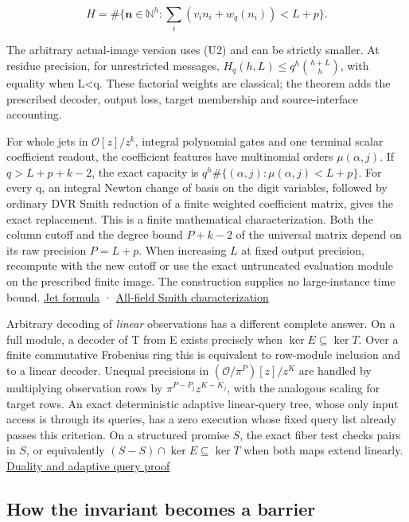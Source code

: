 \documentclass[
  11pt,
]{article}
\begin{document}
\[
 H=\#\{\boldsymbol n\in\mathbb N^h:
       \sum_i(v_i n_i+w_q(n_i))<L+p\}. \tag{U6}
\]

The arbitrary actual-image version uses (U2) and can be strictly
smaller. At residue precision, for unrestricted messages,
\(H_q(h,L)\le q^h\binom{h+L}{h}\), with equality when L\textless q.
These factorial weights are classical; the theorem adds the prescribed
decoder, output loss, target membership and source-interface accounting.

For whole jets in \(\mathcal O[z]/z^k\), integral polynomial gates and
one terminal scalar coefficient readout, the coefficient features have
multinomial orders \(\mu(\alpha,j)\). If \(q>L+p+k-2\), the exact
capacity is \(q^h\#\{(\alpha,j):\mu(\alpha,j)<L+p\}\). For every q, an
integral Newton change of basis on the digit variables, followed by
ordinary DVR Smith reduction of a finite weighted coefficient matrix,
gives the exact replacement. This is a finite mathematical
characterization. Both the column cutoff and the degree bound \(P+k-2\)
of the universal matrix depend on its raw precision \(P=L+p\). When
increasing \(L\) at fixed output precision, recompute with the new
cutoff or use the exact untruncated evaluation module on the prescribed
finite image. The construction supplies no large-instance time bound.
\hyperref[v8-section-jet-polynomial-capacity]{Jet formula} ·
\hyperref[v8-section-jet-newton-smith]{All-field Smith characterization}

Arbitrary decoding of \emph{linear} observations has a different
complete answer. On a full module, a decoder of T from E exists
precisely when \(\ker E\subseteq\ker T\). Over a finite commutative
Frobenius ring this is equivalent to row-module inclusion and to a
linear decoder. Unequal precisions in \((\mathcal O/\pi^P)[z]/z^K\) are
handled by multiplying observation rows by \(\pi^{P-P_j}z^{K-K_j}\),
with the analogous scaling for target rows. An exact deterministic
adaptive linear-query tree, whose only input access is through its
queries, has a zero execution whose fixed query list already passes this
criterion. On a structured promise \(S\), the exact fiber test checks
pairs in \(S\), or equivalently \((S-S)\cap\ker E\subseteq\ker T\) when
both maps extend linearly. \hyperref[v8-section-duality-typeset]{Duality
and adaptive query proof}

\subsection{How the invariant becomes a
barrier}\label{v8-how-the-invariant-becomes-a-barrier}
\end{document}

